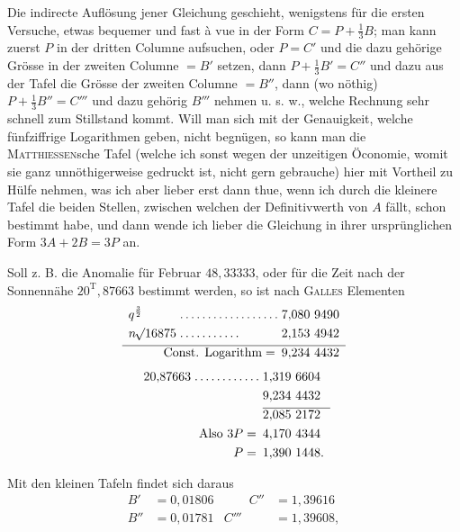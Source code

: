 \noindent\hspace*{\parindent}Die indirecte Auflösung jener Gleichung geschieht, wenigstens für die ersten Versuche, etwas bequemer und fast à vue in der Form \(C=P+\tfrac13B\); man kann zuerst \(P\) in der dritten Columne aufsuchen, oder \(P=C'\) und die dazu gehörige Grösse in der zweiten Columne \(=B'\) setzen, dann \(P+\tfrac13B'=C''\) und dazu aus der Tafel die Grösse der zweiten Columne \(=B''\), dann (wo nöthig) \(P+\tfrac13B''=C'''\) und dazu gehörig \(B'''\) nehmen u. s. w., welche Rechnung sehr schnell zum Stillstand kommt. Will man sich mit der Genauigkeit, welche fünfziffrige Logarithmen geben, nicht begnügen, so kann man die \textsc{Matthiessen}sche Tafel (welche ich sonst wegen der unzeitigen Öconomie, womit sie ganz unnöthigerweise gedruckt ist, nicht gern gebrauche) hier mit Vortheil zu Hülfe nehmen, was ich aber lieber erst dann thue, wenn ich durch die kleinere Tafel die beiden Stellen, zwischen welchen der Definitivwerth von \(A\) fällt, schon bestimmt habe, und dann wende ich lieber die Gleichung in ihrer ursprünglichen Form \(3A+2B=3P\) an.
\par
\noindent\hspace*{\parindent}Soll z. B. die Anomalie für Februar \(48{,}33333\), oder für die Zeit nach der Sonnennähe \(20^{\mathrm T}{,}87663\) bestimmt werden, so ist nach \textsc{Galles} Elementen
\[
\begin{array}{l@{\;}l@{\;}l}
q^{\frac32}&.\,.\,.\,.\,.\,.\,.\,.\,.\,.\,.\,.\,.\,.\,.\,.\,.\,.&7{,}080\ 9490\\[3pt]
n\BareRoot{16875}&.\,.\,.\,.\,.\,.\,.\,.\,.\,.\,.&2{,}153\ 4942\\[3pt]\hline
\multicolumn{2}{r}{\text{Const. Logarithm}=}&9{,}234\ 4432
\end{array}
\]
\[
\begin{array}{r@{\;}l@{\;}l}
20{,}87663&.\,.\,.\,.\,.\,.\,.\,.\,.\,.\,.\,.&1{,}319\ 6604\\[3pt]
&&9{,}234\ 4432\\[3pt]\cline{3-3}
&&2{,}085\ 2172\\[3pt]
\multicolumn{2}{r}{\text{Also }3P=}&4{,}170\ 4344\\[3pt]
\multicolumn{2}{r}{P=}&1{,}390\ 1448.
\end{array}
\]
\par
\noindent\hspace*{\parindent}Mit den kleinen Tafeln findet sich daraus
\[
\begin{aligned}
B'&=0{,}01806&\qquad C''&=1{,}39616\\[3pt]
B''&=0{,}01781&C'''&=1{,}39608,
\end{aligned}
\]
